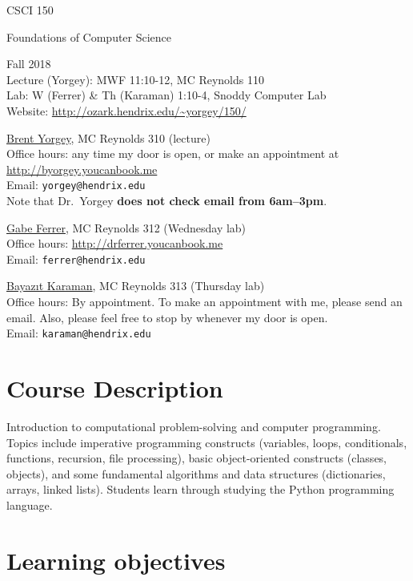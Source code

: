 \documentclass{article}
\begin{document}
{\Large
\noindent CSCI 150 \smallskip

\noindent Foundations of Computer Science \bigskip
}

\noindent Fall 2018 \\
Lecture (Yorgey): MWF 11:10-12, MC Reynolds 110\\
Lab: W (Ferrer) \& Th (Karaman) 1:10-4, Snoddy Computer Lab\\
Website: \url{http://ozark.hendrix.edu/~yorgey/150/} \\
\medskip

\noindent \href{http://ozark.hendrix.edu/~yorgey/}{Brent Yorgey}, MC Reynolds 310 (lecture)\\
Office hours: any time my door is open, or make an appointment at \\
\indent \url{http://byorgey.youcanbook.me} \\
Email: \texttt{yorgey@hendrix.edu} \\
Note that Dr.\ Yorgey \textbf{does not check email from 6am--3pm}.\medskip

\noindent \href{http://ozark.hendrix.edu/~ferrer/}{Gabe Ferrer}, MC Reynolds 312 (Wednesday lab)\\
Office hours: \url{http://drferrer.youcanbook.me} \\
Email: \texttt{ferrer@hendrix.edu}\medskip

\noindent \href{http://bayazitkaraman.com}{Bayazıt Karaman}, MC Reynolds 313 (Thursday lab)\\
Office hours: By appointment. To make an appointment with me, please send an email. Also, please feel free to stop by whenever my door is open. \\
Email: \texttt{karaman@hendrix.edu}

\section*{Course Description}

Introduction to computational problem-solving and computer
programming. Topics include imperative programming constructs
(variables, loops, conditionals, functions, recursion, file
processing), basic object-oriented constructs (classes, objects), and
some fundamental algorithms and data structures (dictionaries, arrays,
linked lists). Students learn through studying the Python programming
language.

\section*{Learning objectives}
\end{document}
